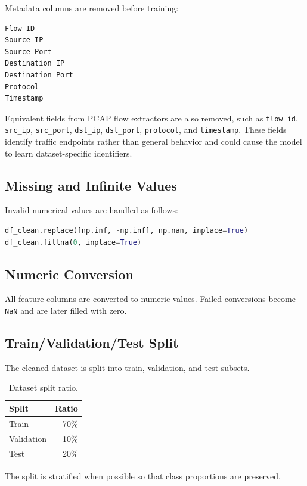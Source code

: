 \documentclass[12pt,a4paper]{article}
\begin{document}
Metadata columns are removed before training:

\begin{lstlisting}
Flow ID
Source IP
Source Port
Destination IP
Destination Port
Protocol
Timestamp
\end{lstlisting}

Equivalent fields from PCAP flow extractors are also removed, such as \texttt{flow\_id}, \texttt{src\_ip}, \texttt{src\_port}, \texttt{dst\_ip}, \texttt{dst\_port}, \texttt{protocol}, and \texttt{timestamp}. These fields identify traffic endpoints rather than general behavior and could cause the model to learn dataset-specific identifiers.

\subsection{Missing and Infinite Values}

Invalid numerical values are handled as follows:

\begin{lstlisting}[language=Python]
df_clean.replace([np.inf, -np.inf], np.nan, inplace=True)
df_clean.fillna(0, inplace=True)
\end{lstlisting}

\subsection{Numeric Conversion}

All feature columns are converted to numeric values. Failed conversions become \texttt{NaN} and are later filled with zero.

\subsection{Train/Validation/Test Split}

The cleaned dataset is split into train, validation, and test subsets.

\begin{longtable}{l r}
\caption{Dataset split ratio.}\\
\toprule
\textbf{Split} & \textbf{Ratio} \\
\midrule
Train & 70\% \\
Validation & 10\% \\
Test & 20\% \\
\bottomrule
\end{longtable}

The split is stratified when possible so that class proportions are preserved.
\end{document}
